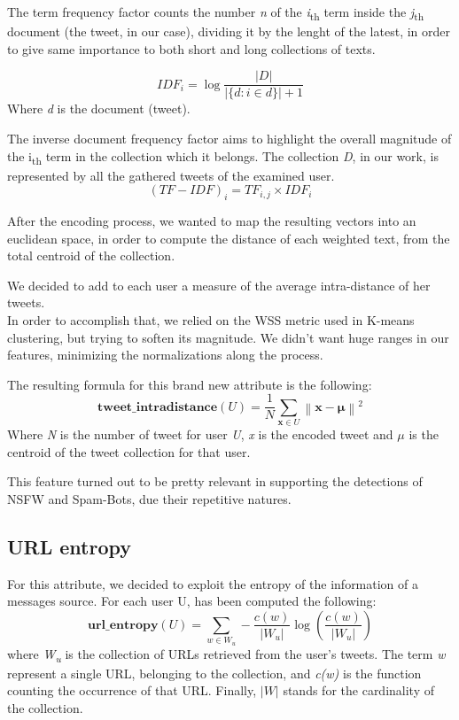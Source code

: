 The term frequency factor counts the number \textit{n} of the \textit{i}\textsubscript{th} term inside the \textit{j}\textsubscript{th} document (the tweet, in our case), dividing it by the lenght of the latest, in order to give same importance to both short and long collections of texts.

\[ IDF_{i} =\log {\frac {|D|}{|\{d:i\in d\}| + 1}} \]
Where \textit{d} is the document (tweet).

The inverse document frequency factor aims to highlight the overall magnitude of the  i\textsubscript{th} term in the collection  which it belongs. The collection \textit{D}, in our work, is represented by all the gathered tweets of the examined user.
\[(TF-IDF)_{i} = TF_{i,j} \times IDF_{i} \]

After the encoding process, we wanted to map the resulting vectors into an euclidean space, in order to compute the distance of each weighted text, from the total centroid of the collection.

We decided to add to each user a measure of the average intra-distance of her tweets.\\
In order to accomplish that, we relied on the WSS metric used in K-means clustering, but trying to soften its magnitude. We didn't want huge ranges in our features, minimizing the normalizations along the process.

The resulting formula for this brand new attribute is the following:
\[\textbf{tweet\_intradistance}(U) = \frac{1}{N}\sum _{\mathbf {x} \in U}\left\|\mathbf {x} -{\boldsymbol {\mu }}\right\|^{2}\]
Where \textit{N} is the number of tweet for user \textit{U}, \textit{x} is the encoded tweet and $\mu$ is the centroid of the tweet collection for that user.

This feature turned out to be pretty relevant in supporting the detections of NSFW and Spam-Bots, due their repetitive natures.

\subsection{URL entropy}

For this attribute, we decided to exploit the entropy of the information of a messages source. 
For each user U, has been computed the following:
\[\textbf{url\_entropy}(U) = \sum _{w \in W_{u}}-\frac{c(w)}{|W_{u}|}\log( \frac{c(w)}{|W_{u}|})\]
where \textit{W\textsubscript{u}} is the collection of URLs retrieved from the user's tweets. The term \textit{w} represent a single URL, belonging to the collection, and  
\textit{c(w)} is the function counting the occurrence of that URL. Finally, $ \mathit{|W|}$ stands for the cardinality of the collection.

